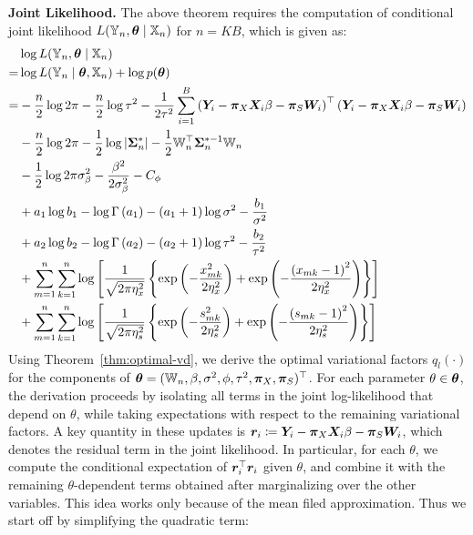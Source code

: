 \documentclass[numsec,webpdf,modern,medium,namedate]{oup-authoring-template}
\theoremstyle{thmstyleone}%
\theoremstyle{thmstyletwo}%
\theoremstyle{thmstylethree}%
\begin{document}
\textbf{Joint Likelihood.} The above theorem requires the computation of conditional joint likelihood $L(\mathbb{Y}_n,\boldsymbol{\theta}\mid\mathbb{X}_n)$ for $n = KB$, which is given as:
\begin{equation}\label{eq:joint-likelihood}
    \begin{split}
&\log L(\mathbb{Y}_n,\boldsymbol{\theta}\mid\mathbb{X}_n) \\
= & \log L(\mathbb{Y}_n\mid\boldsymbol{\theta},\mathbb{X}_n) + \log p(\boldsymbol{\theta})\\
= & - \frac{n}{2} \log2 \pi - \frac{n}{2}\log\tau^2-\frac{1}{2 \tau^2} \sum_{i=1}^B\left(\boldsymbol{Y}_i-\boldsymbol{\pi}_X \boldsymbol{X}_i \beta -\boldsymbol{\pi}_S \boldsymbol{W}_i\right)^{\top}\left(\boldsymbol{Y}_i-\boldsymbol{\pi}_X \boldsymbol{X}_i \beta -\boldsymbol{\pi}_S \boldsymbol{W}_i\right) \\
&- \frac{n}{2} \log 2 \pi-\frac{1}{2} \log |\boldsymbol{\Sigma}^\ast_n| - \frac{1}{2}\mathbb{W}_n^\top \boldsymbol{\Sigma}_n^{\ast-1} \mathbb{W}_n\\
& -\dfrac{1}{2}\log 2\pi\sigma^2_\beta-\dfrac{\beta^2}{2 \sigma_\beta^2}-C_\phi \\
&+a_1 \log b_1-\log \Gamma\left(a_1\right)-\left(a_1+1\right) \log \sigma^2 -\frac{b_1}{\sigma^2} \\
&+a_2 \log b_2-\log \Gamma\left(a_2\right)-\left(a_2+1\right) \log \tau^2 -\dfrac{b_2}{\tau^2}\\
&+\sum_{m=1}^{n}\sum_{k=1}^{n} \log \left[\frac{1}{\sqrt{2 \pi \eta^2_x}}\left\{\exp \left(-\frac{x_{m k}^2}{2 \eta_x^2}\right)+\exp \left(-\frac{\left(x_{m k}-1\right)^2}{2 \eta_x^2}\right)\right\}\right]\\
&+\sum_{m=1}^{n}\sum_{k=1}^{n}\log \left[\frac{1}{\sqrt{2 \pi \eta^2_s}}\left\{\exp \left(-\frac{s_{m k}^2}{2 \eta_s^2}\right)+\exp \left(-\frac{\left(s_{m k}-1\right)^2}{2 \eta_s^2}\right)\right\}\right]
    \end{split}
\end{equation}
Using Theorem~\ref{thm:optimal-vd}, we derive the optimal variational factors $q_l(\cdot)$ for the components of $\boldsymbol{\theta} = (\mathbb{W}_n,\beta,\sigma^2,\phi,\tau^2,\boldsymbol{\pi}_X,\boldsymbol{\pi}_S)^\top$.
For each parameter \(\theta \in \boldsymbol{\theta}\), the derivation proceeds by isolating all terms in the joint log-likelihood that depend on \(\theta\), while taking expectations with respect to the remaining variational factors. A key quantity in these updates is $\boldsymbol{r}_i \coloneq \boldsymbol{Y}_i - \boldsymbol{\pi}_X \boldsymbol{X}_i \beta - \boldsymbol{\pi}_S \boldsymbol{W}_i$, which denotes the residual term in the joint likelihood. In particular, for each \(\theta\), we compute the conditional expectation of \(\boldsymbol{r}_i^\top \boldsymbol{r}_i\) given \(\theta\), and combine it with the remaining $\theta$-dependent terms obtained after marginalizing over the other variables. This idea works only because of the mean filed approximation. Thus we start off by simplifying the quadratic term:
\end{document}

